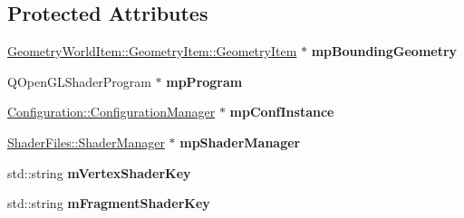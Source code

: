 \subsection*{Protected Attributes}
\begin{DoxyCompactItemize}
\item 
\mbox{\label{class_geometry_engine_1_1_geometry_post_process_1_1_post_process_a31aaf5e7130fc3877c0e98e570aee049}} 
\mbox{\hyperlink{class_geometry_engine_1_1_geometry_world_item_1_1_geometry_item_1_1_geometry_item}{Geometry\+World\+Item\+::\+Geometry\+Item\+::\+Geometry\+Item}} $\ast$ {\bfseries mp\+Bounding\+Geometry}
\item 
\mbox{\label{class_geometry_engine_1_1_geometry_post_process_1_1_post_process_aba344bd1d71b013ec7fed0319a4a5904}} 
Q\+Open\+G\+L\+Shader\+Program $\ast$ {\bfseries mp\+Program}
\item 
\mbox{\label{class_geometry_engine_1_1_geometry_post_process_1_1_post_process_a90d5206b07e59c7b34f7e43bb8832636}} 
\mbox{\hyperlink{class_configuration_1_1_configuration_manager}{Configuration\+::\+Configuration\+Manager}} $\ast$ {\bfseries mp\+Conf\+Instance}
\item 
\mbox{\label{class_geometry_engine_1_1_geometry_post_process_1_1_post_process_a1cc028176cf87c2b82694fe56896937e}} 
\mbox{\hyperlink{class_shader_files_1_1_shader_manager}{Shader\+Files\+::\+Shader\+Manager}} $\ast$ {\bfseries mp\+Shader\+Manager}
\item 
\mbox{\label{class_geometry_engine_1_1_geometry_post_process_1_1_post_process_ad435249babab48a1df24532c314f8f43}} 
std\+::string {\bfseries m\+Vertex\+Shader\+Key}
\item 
\mbox{\label{class_geometry_engine_1_1_geometry_post_process_1_1_post_process_a9fa0ab7cc584c09e5421bf3a79a26789}} 
std\+::string {\bfseries m\+Fragment\+Shader\+Key}
\end{DoxyCompactItemize}


